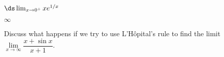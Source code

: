 \begin{multicols}{2}[]
\begin{enumialphparenastyle}
\begin{ex} 
{$\ds \lim_{x\to 0^+} xe^{1/x}$}

\begin{sol}
 {$\infty$} 
\end{sol}

\end{ex}



\begin{ex}
Discuss what happens if we try to use L'H\^{o}pital's rule to find the limit $\lim\limits_{x\rightarrow \infty}\dfrac{x+\sin x}{x+1}$.
\end{ex}

\end{enumialphparenastyle}

\end{multicols}
\clearpage
